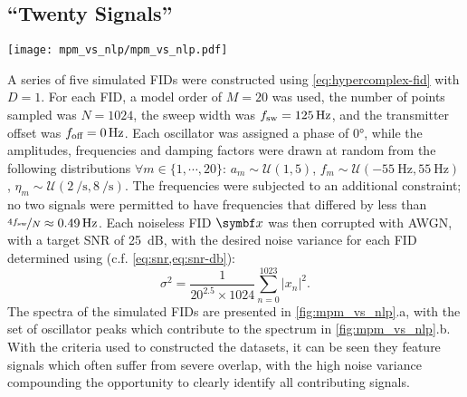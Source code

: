 \subsection{``Twenty Signals''}
\begin{sidewaysfigure}
    \centering
    \texttt{[image: mpm\_vs\_nlp/mpm\_vs\_nlp.pdf]}
    \caption[
        The result of estimating a series of 5 simulated signals comprising 20
        signals, using solely the \acs{MPM} and also with phase
        variance-regularised \acs{NLP} afterwards.
    ]{
        The result of estimating a series of 5 simulated signals comprising 20
        signals. See the main text for details on how the datasets were constructed.
        \textbf{a.} Spectra of the datasets generated.
        \textbf{b.} Spectral lines corresponding to the set of signals
        used to generate each dataset.
        \textbf{c.} Plots of peaks for each oscillator generated using
        the \acs{MPM}.
        \textbf{d.} An equivalent plot for the result after applying phase
        variance-regularised \acs{NLP}, using the \acs{MPM} result as an
        initial guess.  Also included in c. and d. is the
        residual between the data and the sum of the oscillator peaks (grey
        line). The colouring of the oscillators in c. and d. is described
        in the main text.
    }
    \label{fig:mpm_vs_nlp}
\end{sidewaysfigure}
A series of five simulated \acp{FID} were constructed using
\cref{eq:hypercomplex-fid} with $D=1$. For each \ac{FID}, a model order
of $M=20$ was used, the number of points sampled was $N = 1024$, the sweep
width was $f_{\mathrm{sw}}=\qty{125}{\hertz}$, and the transmitter offset was $f_{\text{off}}
= \qty{0}{\hertz}$.  Each oscillator was assigned a phase of \ang{0}, while the
amplitudes, frequencies and damping factors were drawn at random from the
following distributions
$\forall m \in \lbrace 1, \cdots, 20\rbrace$:
$a_m \sim \mathcal{U}(1, 5)$, $f_m \sim \mathcal{U}(\qty{-55}{\hertz},
\qty{55}{\hertz})$, $\eta_m \sim \mathcal{U}(\qty{2}{\per\second},
\qty{8}{\per\second})$. The frequencies were subjected to an additional
constraint; no two signals were permitted to have frequencies that
differed by less than $\nicefrac{4 f_{\mathrm{sw}}}{N} \approx \qty{0.49}{\hertz}$.
Each noiseless \ac{FID} $\bx$ was then corrupted with \ac{AWGN}, with a target
\ac{SNR} of \qty{25}{\deci\bel}, with the desired noise variance for each
\ac{FID} determined using (c.f. \cref{eq:snr,eq:snr-db}):
\begin{equation}
    \sigma^2 = \frac{1}{20^{2.5} \times 1024}
        \sum_{n=0}^{1023} \lvert x_n \rvert^2.
\end{equation}
The spectra of the simulated \acp{FID} are presented in
\cref{fig:mpm_vs_nlp}.a, with the set of oscillator peaks which contribute
to the spectrum in \cref{fig:mpm_vs_nlp}.b. With the criteria used to
constructed the datasets, it can be seen they feature signals which often
suffer from severe overlap, with the high noise variance compounding the
opportunity to clearly identify all contributing signals.

